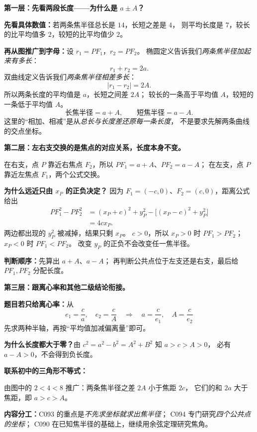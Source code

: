 \clearpage
\begin{explanationbox}
\textbf{第一层：先看两段长度——为什么是 $a\pm A$？}

\textbf{先看具体数值：}若两条焦半径总长是 $14$，长短之差是 $4$，
则平均长度是 $7$，较长的比平均值多 $2$，较短的比平均值少 $2$。

\begin{center}

\end{center}

\textbf{再从图推广到字母：}设 $r_1=PF_1$，$r_2=PF_2$。
椭圆定义告诉我们\emph{两条焦半径加起来有多长}：
\[r_1+r_2=2a.\]
双曲线定义告诉我们\emph{两条焦半径相差多长}：
\[|r_1-r_2|=2A.\]
所以两条长度的平均值是 $a$，长短之间差 $2A$；
较长的一条高于平均值 $A$，较短的一条低于平均值 $A$。
\[
\boxed{\text{长焦半径}=a+A},\qquad
\boxed{\text{短焦半径}=a-A}.
\]
这里的“相加、相减”是从\emph{总长与长度差还原每一条长度}，
不是要求先解两条曲线的交点坐标。
\end{explanationbox}

\clearpage
\begin{explanationbox}
\textbf{第二层：左右支交换的是焦点的对应关系，长度本身不变。}

\begin{center}

\end{center}

在右支，点 $P$ 靠近右焦点 $F_2$，所以
$PF_1=a+A$、$PF_2=a-A$；
在左支，点 $P$ 靠近左焦点 $F_1$，两个公式交换。

\textbf{为什么远近只由 $x_P$ 的正负决定？}
因为 $F_1=(-c,0)$、$F_2=(c,0)$，距离公式给出
\[
\begin{aligned}
PF_1^2-PF_2^2
&=(x_P+c)^2+y_P^2-\bigl[(x_P-c)^2+y_P^2\bigr]\\
&=\boxed{4cx_P}.
\end{aligned}
\]
两边都出现的 $y_P^2$ 被减掉，结果只剩 $x_P$。
$c>0$，所以 $x_P>0$ 时 $PF_1>PF_2$；
$x_P<0$ 时 $PF_1<PF_2$。
改变 $y_P$ 的正负不会改变任一焦半径。

\textbf{判断顺序：}先算出 $a+A$、$a-A$；
再判断公共点位于左支还是右支，最后给 $PF_1,PF_2$ 分配长度。
\end{explanationbox}

\clearpage
\begin{explanationbox}
\textbf{第三层：跟离心率和其他二级结论衔接。}

\textbf{题目若只给离心率：}从
\[
e_1=\frac c{a},\quad e_2=\frac c{A}
\quad\Longrightarrow\quad a=\frac c{e_1},\quad A=\frac c{e_2}
\]
先求两种半轴，再按“平均值加减偏离量”即可。

\textbf{为什么长度都大于零？}由 $c^2=a^2-b^2=A^2+B^2$ 知 $a>c>A>0$，
必有 $a-A>0$，不会得到负长度。

\textbf{联系初中的三角形不等式：}
\begin{center}

\end{center}
由图中的 $2<4<8$ 推广：两条焦半径之差 $2A$ 小于焦距 $2c$，
它们的和 $2a$ 大于焦距，即 $a>c>A$。

\textbf{内容分工：}C093 的重点是\emph{不先求坐标就求出焦半径}；
C094 专门研究\emph{四个公共点的坐标}；
C090 在已知焦半径的基础上，继续用余弦定理研究焦角。
\end{explanationbox}
